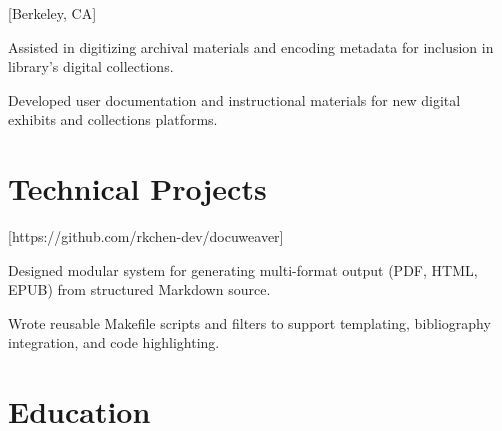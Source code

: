 \documentclass{stitched}
\begin{document}
[Berkeley, CA]
\begin{duties}
\item Assisted in digitizing archival materials and encoding metadata for inclusion in library's digital collections.
\item Developed user documentation and instructional materials for new digital exhibits and collections platforms.
\end{duties}


\section{Technical Projects}

[https://github.com/rkchen-dev/docuweaver]
\begin{duties}
\item Designed modular system for generating multi-format output (PDF, HTML, EPUB) from structured Markdown source.
\item Wrote reusable Makefile scripts and filters to support templating, bibliography integration, and code highlighting.
\end{duties}

\section{Education}
\begin{education}
\end{education}
\end{document}
